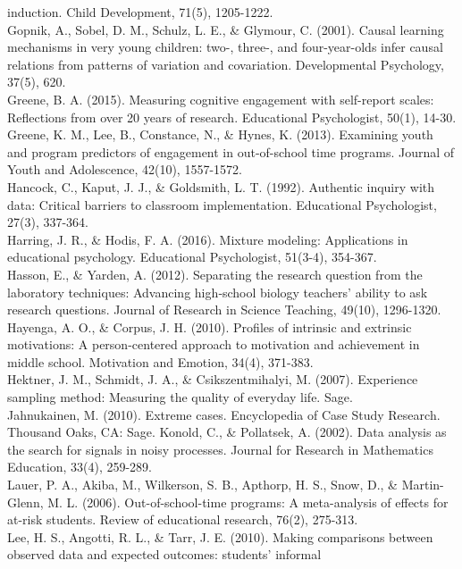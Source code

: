 \documentclass[]{book}
\theoremstyle{definition}
\theoremstyle{definition}
\theoremstyle{definition}
\theoremstyle{remark}
\begin{document}
induction. Child Development, 71(5), 1205-1222.\\
Gopnik, A., Sobel, D. M., Schulz, L. E., \& Glymour, C. (2001). Causal
learning mechanisms in very young children: two-, three-, and
four-year-olds infer causal relations from patterns of variation and
covariation. Developmental Psychology, 37(5), 620.\\
Greene, B. A. (2015). Measuring cognitive engagement with self-report
scales: Reflections from over 20 years of research. Educational
Psychologist, 50(1), 14-30.\\
Greene, K. M., Lee, B., Constance, N., \& Hynes, K. (2013). Examining
youth and program predictors of engagement in out-of-school time
programs. Journal of Youth and Adolescence, 42(10), 1557-1572.\\
Hancock, C., Kaput, J. J., \& Goldsmith, L. T. (1992). Authentic inquiry
with data: Critical barriers to classroom implementation. Educational
Psychologist, 27(3), 337-364.\\
Harring, J. R., \& Hodis, F. A. (2016). Mixture modeling: Applications
in educational psychology. Educational Psychologist, 51(3-4), 354-367.\\
Hasson, E., \& Yarden, A. (2012). Separating the research question from
the laboratory techniques: Advancing high‐school biology teachers'
ability to ask research questions. Journal of Research in Science
Teaching, 49(10), 1296-1320.\\
Hayenga, A. O., \& Corpus, J. H. (2010). Profiles of intrinsic and
extrinsic motivations: A person-centered approach to motivation and
achievement in middle school. Motivation and Emotion, 34(4), 371-383.\\
Hektner, J. M., Schmidt, J. A., \& Csikszentmihalyi, M. (2007).
Experience sampling method: Measuring the quality of everyday life.
Sage.\\
Jahnukainen, M. (2010). Extreme cases. Encyclopedia of Case Study
Research. Thousand Oaks, CA: Sage. Konold, C., \& Pollatsek, A. (2002).
Data analysis as the search for signals in noisy processes. Journal for
Research in Mathematics Education, 33(4), 259-289.\\
Lauer, P. A., Akiba, M., Wilkerson, S. B., Apthorp, H. S., Snow, D., \&
Martin-Glenn, M. L. (2006). Out-of-school-time programs: A meta-analysis
of effects for at-risk students. Review of educational research, 76(2),
275-313.\\
Lee, H. S., Angotti, R. L., \& Tarr, J. E. (2010). Making comparisons
between observed data and expected outcomes: students' informal
\end{document}
